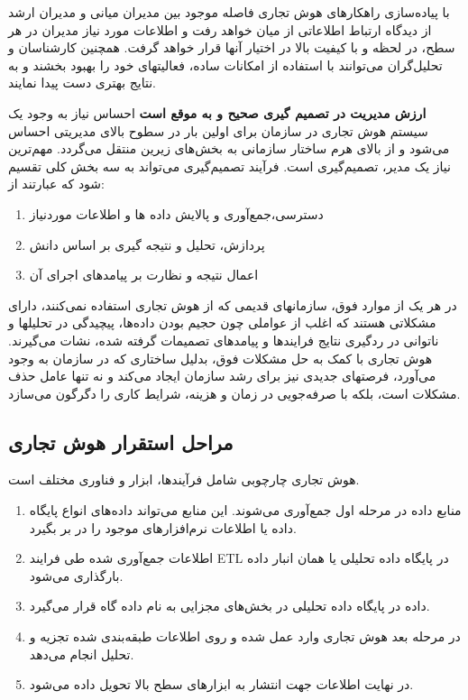 \documentclass{llncs}
\begin{document}
با پیاده‌سازی راهکارهای هوش تجاری فاصله موجود بین مدیران میانی و مدیران ارشد از دیدگاه ارتباط اطلاعاتی از میان خواهد رفت و اطلاعات مورد نیاز مدیران در هر سطح، در لحظه و با کیفیت بالا در اختیار آنها قرار خواهد گرفت. همچنین کارشناسان و تحلیل‌گران می‌توانند با استفاده از امکانات ساده، فعالیتهای خود را بهبود بخشند و به نتایج بهتری دست پیدا نمایند.

\textbf{ارزش مدیریت در تصمیم گیری صحیح و به موقع است}
احساس نیاز به وجود یک سیستم هوش تجاری در سازمان برای اولین بار در سطوح بالای مدیریتی احساس می‌شود و از بالای هرم ساختار سازمانی به بخش‌های زیرین منتقل می‌گردد. مهم‌ترین نیاز یک مدیر، تصمیم‌گیری است. فرآیند تصمیم‌گیری می‌تواند به سه بخش کلی تقسیم شود که عبارتند از:
\begin{enumerate}
    \item دسترسی،جمع‌آوری و پالایش داده ها و اطلاعات موردنیاز
    \item پردازش، تحلیل و نتیجه گیری بر اساس دانش
    \item اعمال نتیجه و نظارت بر پیامدهای اجرای آن
\end{enumerate}
در هر یک از موارد فوق، سازمانهای قدیمی که از هوش تجاری استفاده نمی‌کنند، دارای مشکلاتی هستند که اغلب از عواملی چون حجیم بودن داده‌ها، پیچیدگی در تحلیلها و ناتوانی در ردگیری نتایج فرایندها و پیامدهای تصمیمات گرفته شده، نشات می‌گیرند. هوش تجاری با کمک به حل مشکلات فوق، بدلیل ساختاری که در سازمان به وجود می‌آورد، فرصتهای جدیدی نیز برای رشد سازمان ایجاد می‌کند و نه تنها عامل حذف مشکلات است، بلکه با صرفه‌جویی در زمان و هزینه، شرایط کاری را دگرگون می‌سازد.

\subsection{مراحل استقرار هوش تجاری}
هوش تجاری چارچوبی شامل فرآیندها، ابزار و فناوری مختلف است.
\begin{enumerate}
    \item منابع داده در مرحله اول جمع‌آوری می‌شوند. این منابع می‌تواند داده‌های انواع پایگاه داده یا اطلاعات نرم‌افزارهای موجود را در بر بگیرد.
    \item اطلاعات جمع‌آوری شده طی فرایند ETL در پایگاه داده تحلیلی یا همان انبار داده بارگذاری می‌شود.
    \item داده در پایگاه داده تحلیلی در بخش‌های مجزایی به نام داده گاه قرار می‌گیرد.
    \item در مرحله بعد هوش تجاری وارد عمل شده و روی اطلاعات طبقه‌بندی شده تجزیه و تحلیل انجام می‌دهد.
    \item در نهایت اطلاعات جهت انتشار به ابزارهای سطح بالا تحویل داده می‌شود.

\end{enumerate}
\end{document}
